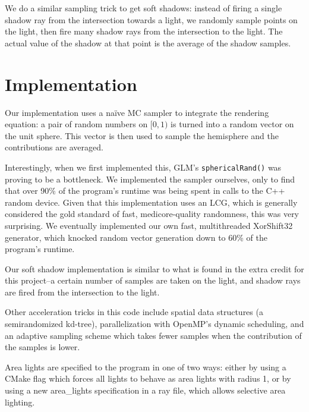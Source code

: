 \documentclass{article}
\begin{document}
We do a similar sampling trick to get soft shadows: instead of firing
a single shadow ray from the intersection towards a light, we randomly sample
points on the light, then fire many shadow rays from the intersection to the 
light. The actual value of the shadow at that point is the average of the
shadow samples.

\section{Implementation}

Our implementation uses a na\"ive MC sampler to integrate the rendering 
equation: a pair of random numbers on $[0,1)$ is turned into a random vector
on the unit sphere. This vector is then used to sample the hemisphere
and the contributions are averaged.

Interestingly, when we first implemented this, GLM's \texttt{sphericalRand()}
was proving to be a bottleneck. We implemented the sampler ourselves, only to
find that over 90\% of the program's runtime was being spent in calls to the
C++ random device. Given that this implementation uses an LCG, which is
generally considered the gold standard of fast, medicore-quality randomness,
this was very surprising. We eventually implemented our own fast, multithreaded
XorShift32 generator, which knocked random vector generation down to 60\% of
the program's runtime.

Our soft shadow implementation is similar to what is found in the extra credit
for this project--a certain number of samples are taken on the light, and shadow
rays are fired from the intersection to the light.

Other acceleration tricks in this code include spatial data structures (a
semirandomized kd-tree), parallelization with OpenMP's dynamic scheduling, and
an adaptive sampling scheme which takes fewer samples when the contribution of
the samples is lower.

Area lights are specified to the program in one of two ways: either by using
a CMake flag which forces all lights to behave as area lights with radius 1,
or by using a new area\_lights specification in a ray file, which allows
selective area lighting.
\end{document}

